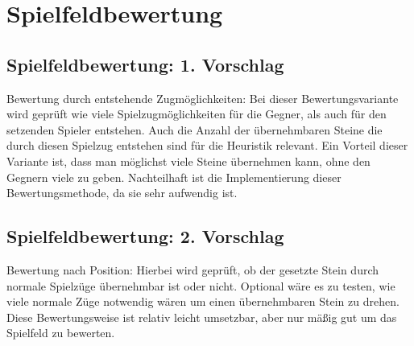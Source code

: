 \documentclass[12pt,a4paper]{article}
\begin{document}
\section{Spielfeldbewertung}
\subsection{Spielfeldbewertung: 1. Vorschlag}
Bewertung durch entstehende Zugmöglichkeiten:\newline
Bei dieser Bewertungsvariante wird geprüft wie viele Spielzugmöglichkeiten für die Gegner, als auch für den setzenden Spieler entstehen. Auch die Anzahl der übernehmbaren Steine die durch diesen Spielzug entstehen sind für die Heuristik relevant.\newline
Ein Vorteil dieser Variante ist, dass man möglichst viele Steine übernehmen kann, ohne den Gegnern viele zu geben.\newline
Nachteilhaft ist die Implementierung dieser Bewertungsmethode, da sie sehr aufwendig ist.

\subsection{Spielfeldbewertung: 2. Vorschlag}
Bewertung nach Position:\newline
Hierbei wird geprüft, ob der gesetzte Stein durch normale Spielzüge übernehmbar ist oder nicht. Optional wäre es zu testen, wie viele normale Züge notwendig wären um einen übernehmbaren Stein zu drehen.\newline 
Diese Bewertungsweise ist relativ leicht umsetzbar, aber nur mäßig gut um das Spielfeld zu bewerten.
\newpage
\end{document}
